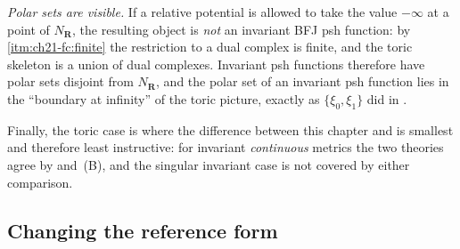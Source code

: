 \begin{example}
\emph{Polar sets are visible.}  If a relative potential is allowed to take the value
$-\infty$ at a point of $N_{\mathbf R}$, the resulting object is \emph{not} an
invariant BFJ psh function: by
\,\cref{itm:ch21-fc:finite} the
restriction to a dual complex is finite, and the toric skeleton is a union
of dual complexes.  Invariant psh functions therefore have polar sets
disjoint from $N_{\mathbf R}$, and the polar set of an invariant psh
function lies in the ``boundary at infinity'' of the toric picture, exactly
as $\{\xi_0,\xi_1\}$ did in .

Finally, the toric case is where the difference between this chapter and
 is smallest and therefore least instructive: for invariant
\emph{continuous} metrics the two theories agree by
 and
\,(B), and the singular invariant case is
not covered by either comparison.
\end{example}

\subsection{Changing the reference form}
\label{sec:ch21-worked-reference}

